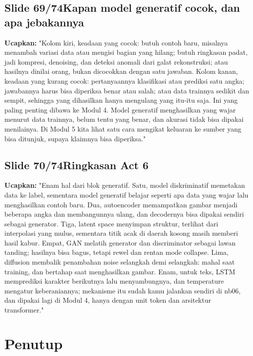 \documentclass[11pt]{article}
\renewcommand{\framebox}[1]{\colorbox{acc!15}{\textcolor{acc}{\textbf{#1}}}}
\begin{document}
\subsection*{\framebox{Slide 69/74}\quad Kapan model generatif cocok, dan apa jebakannya}
\textbf{Ucapkan:} "Kolom kiri, keadaan yang cocok: butuh contoh baru, misalnya menambah variasi data atau mengisi bagian yang hilang; butuh ringkasan padat, jadi kompresi, denoising, dan deteksi anomali dari galat rekonstruksi; atau hasilnya dinilai orang, bukan dicocokkan dengan satu jawaban. Kolom kanan, keadaan yang kurang cocok: pertanyaannya klasifikasi atau prediksi satu angka; jawabannya harus bisa diperiksa benar atau salah; atau data trainnya sedikit dan sempit, sehingga yang dihasilkan hanya mengulang yang itu-itu saja. Ini yang paling penting dibawa ke Modul 4. Model generatif menghasilkan yang wajar menurut data trainnya, belum tentu yang benar, dan akurasi tidak bisa dipakai menilainya. Di Modul 5 kita lihat satu cara mengikat keluaran ke sumber yang bisa ditunjuk, supaya klaimnya bisa diperiksa."\\[2pt]

\subsection*{\framebox{Slide 70/74}\quad Ringkasan Act 6}
\textbf{Ucapkan:} "Enam hal dari blok generatif. Satu, model diskriminatif memetakan data ke label, sementara model generatif belajar seperti apa data yang wajar lalu menghasilkan contoh baru. Dua, autoencoder memampatkan gambar menjadi beberapa angka dan membangunnya ulang, dan decodernya bisa dipakai sendiri sebagai generator. Tiga, latent space menyimpan struktur, terlihat dari interpolasi yang mulus, sementara titik acak di daerah kosong masih memberi hasil kabur. Empat, GAN melatih generator dan discriminator sebagai lawan tanding; hasilnya bisa bagus, tetapi rewel dan rentan mode collapse. Lima, diffusion membalik penambahan noise selangkah demi selangkah: mahal saat training, dan bertahap saat menghasilkan gambar. Enam, untuk teks, LSTM memprediksi karakter berikutnya lalu menyambungnya, dan temperature mengatur keberaniannya; mekanisme itu sudah kamu jalankan sendiri di nb06, dan dipakai lagi di Modul 4, hanya dengan unit token dan arsitektur transformer."\\[2pt]

\section{Penutup}
\end{document}
